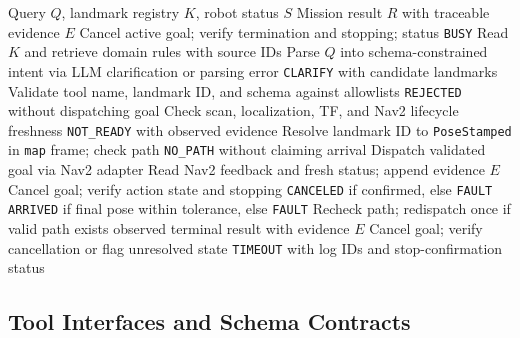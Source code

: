 \documentclass[conference,a4paper]{IEEEtran}
\begin{document}
\begin{algorithm}[!htb]
\caption{Evidence-Grounded Indoor Navigation Agent}
\label{alg:agent}
\footnotesize
\begin{algorithmic}[1]
\REQUIRE Query $Q$, landmark registry $K$, robot status $S$
\ENSURE Mission result $R$ with traceable evidence $E$
    \STATE Cancel active goal; verify termination and stopping; \RETURN status
\ENDIF
{}
    \RETURN \texttt{BUSY}
\ENDIF
\STATE Read $K$ and retrieve domain rules with source IDs
\STATE Parse $Q$ into schema-constrained intent via LLM
    \RETURN clarification or parsing error
\ENDIF
{}
    \RETURN \texttt{CLARIFY} with candidate landmarks
\ENDIF
\STATE Validate tool name, landmark ID, and schema against allowlists
    \RETURN \texttt{REJECTED} without dispatching goal
\ENDIF
\STATE Check scan, localization, TF, and Nav2 lifecycle freshness
    \RETURN \texttt{NOT\_READY} with observed evidence
\ENDIF
\STATE Resolve landmark ID to \texttt{PoseStamped} in \texttt{map} frame; check path
    \RETURN \texttt{NO\_PATH} without claiming arrival
\ENDIF
\STATE Dispatch validated goal via Nav2 adapter
    \STATE Read Nav2 feedback and fresh status; append evidence $E$
        \STATE Cancel goal; verify action state and stopping
        \RETURN \texttt{CANCELED} if confirmed, else \texttt{FAULT}
    \ENDIF
        \RETURN \texttt{ARRIVED} if final pose within tolerance, else \texttt{FAULT}
    \ENDIF
            \STATE Recheck path; redispatch once if valid path exists
        \ELSE
            \RETURN observed terminal result with evidence $E$
        \ENDIF
    \ENDIF
\ENDWHILE
\STATE Cancel goal; verify cancellation or flag unresolved state
\RETURN \texttt{TIMEOUT} with log IDs and stop-confirmation status
\end{algorithmic}
\end{algorithm}

\subsection{Tool Interfaces and Schema Contracts}
\end{document}
